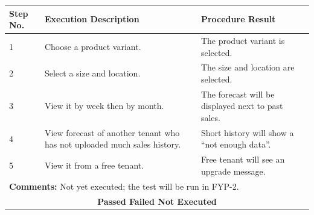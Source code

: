 \documentclass{StockSense}
\begin{document}
\begin{table}[!htbp]
{\begin{tabular}{|p{}|p{}|p{}|p{}|}
\textbf{Step No.} & \textbf{Execution Description} & \multicolumn{2}{l|}{\textbf{Procedure Result}} \\ \hline
1 & Choose a product variant. & \multicolumn{2}{p{\dimexpr0.42\textwidth+2\tabcolsep\relax}|}{The product variant is selected.} \\ \hline
2 & Select a size and location. & \multicolumn{2}{p{\dimexpr0.42\textwidth+2\tabcolsep\relax}|}{The size and location are selected.} \\ \hline
3 & View it by week then by month. & \multicolumn{2}{p{\dimexpr0.42\textwidth+2\tabcolsep\relax}|}{The forecast will be displayed next to past sales.} \\ \hline
4 & View forecast of another tenant who has not uploaded much sales history. & \multicolumn{2}{p{\dimexpr0.42\textwidth+2\tabcolsep\relax}|}{Short history will show a ``not enough data''.} \\ \hline
5 & View it from a free tenant. & \multicolumn{2}{p{\dimexpr0.42\textwidth+2\tabcolsep\relax}|}{Free tenant will see an upgrade message.} \\ \hline
\multicolumn{4}{|l|}{\textbf{Comments:} Not yet executed; the test will be run in FYP-2.} \\ \hline
\multicolumn{4}{|c|}{\textbf{Passed \quad Failed \quad Not Executed}} \\ \hline
\end{tabular}\par}
\end{table}
\end{document}
